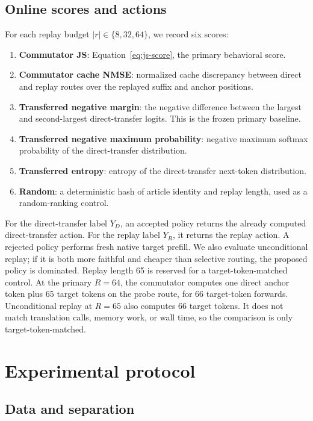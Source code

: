 \documentclass[10pt,twocolumn]{article}
\begin{document}
\subsection{Online scores and actions}

For each replay budget $|r|\in\{8,32,64\}$, we record six scores:

\begin{enumerate}[leftmargin=*,itemsep=2pt]
  \item \textbf{Commutator JS}: Equation~\ref{eq:js-score}, the primary
  behavioral score.
  \item \textbf{Commutator cache NMSE}: normalized cache discrepancy between
  direct and replay routes over the replayed suffix and anchor positions.
  \item \textbf{Transferred negative margin}: the negative difference between
  the largest and second-largest direct-transfer logits.  This is the frozen
  primary baseline.
  \item \textbf{Transferred negative maximum probability}: negative maximum
  softmax probability of the direct-transfer distribution.
  \item \textbf{Transferred entropy}: entropy of the direct-transfer next-token
  distribution.
  \item \textbf{Random}: a deterministic hash of article identity and replay
  length, used as a random-ranking control.
\end{enumerate}

For the direct-transfer label $Y_D$, an accepted policy returns the already
computed direct-transfer action.  For the replay label $Y_R$, it returns the
replay action.  A rejected policy performs fresh native target prefill.  We
also evaluate unconditional replay; if it is both more faithful and cheaper
than selective routing, the proposed policy is dominated.  Replay length 65
is reserved for a target-token-matched control.  At the primary $R=64$, the
commutator computes one direct anchor token plus 65 target tokens on the probe
route, for 66 target-token forwards.  Unconditional replay at $R=65$ also
computes 66 target tokens.  It does not match translation calls, memory work,
or wall time, so the comparison is only target-token-matched.

\section{Experimental protocol}

\subsection{Data and separation}
\end{document}
